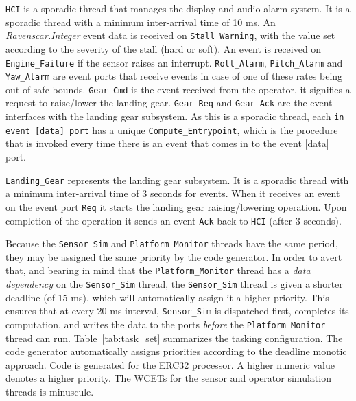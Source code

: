 \texttt{HCI} is a sporadic thread that manages the display and audio
alarm system. It is a sporadic thread with a minimum inter-arrival
time of 10 ms. An \emph{Ravenscar.Integer} event data is received on
\texttt{Stall\_Warning}, with the value set according to the severity
of the stall (hard or soft). An event is received on
\texttt{Engine\_Failure} if the sensor raises an
interrupt. \texttt{Roll\_Alarm}, \texttt{Pitch\_Alarm} and
\texttt{Yaw\_Alarm} are event ports that receive events in case of one
of these rates being out of safe bounds. \texttt{Gear\_Cmd} is the
event received from the operator, it signifies a request to
raise/lower the landing gear. \texttt{Gear\_Req} and
\texttt{Gear\_Ack} are the event interfaces with the landing gear
subsystem. As this is a sporadic thread, each \texttt{in event [data]
  port} has a unique \texttt{Compute\_Entrypoint}, which is the
procedure that is invoked every time there is an event that comes in
to the event [data] port.

\texttt{Landing\_Gear} represents the landing gear subsystem. It is a
sporadic thread with a minimum inter-arrival time of 3 seconds for
events. When it receives an event on the event port \texttt{Req} it
starts the landing gear raising/lowering operation. Upon completion of
the operation it sends an event \texttt{Ack} back to \texttt{HCI}
(after 3 seconds).

Because the \texttt{Sensor\_Sim} and \texttt{Platform\_Monitor}
threads have the same period, they may be assigned the same priority
by the code generator. In order to avert that, and bearing in mind
that the \texttt{Platform\_Monitor} thread has a \emph{data
  dependency} on the \texttt{Sensor\_Sim} thread, the
\texttt{Sensor\_Sim} thread is given a shorter deadline (of 15 ms),
which will automatically assign it a higher priority. This ensures
that at every 20 ms interval, \texttt{Sensor\_Sim} is dispatched
first, completes its computation, and writes the data to the ports
\emph{before} the \texttt{Platform\_Monitor} thread can
run. Table~\ref{tab:task_set} summarizes the tasking
configuration. The code generator automatically assigns priorities
according to the deadline monotic approach. Code is generated for the
ERC32 processor. A higher numeric value denotes a higher priority. The
WCETs for the sensor and operator simulation threads is minuscule.

